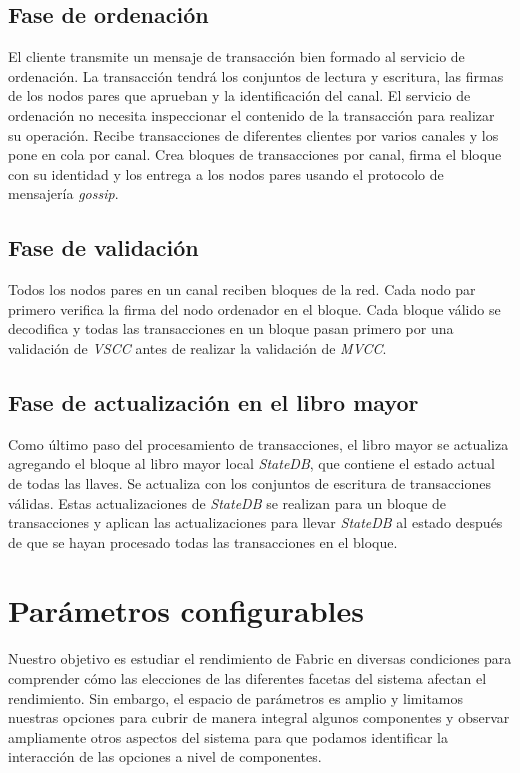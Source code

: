 \subsection{Fase de ordenaci\'on}
El cliente transmite un mensaje de transacci\'on bien formado al servicio de ordenaci\'on. La transacci\'on tendr\'a los conjuntos de lectura y escritura, las firmas de los nodos pares que aprueban y la identificaci\'on del canal. El servicio de ordenaci\'on no necesita inspeccionar el contenido de la transacci\'on para realizar su operaci\'on. Recibe transacciones de diferentes clientes por varios canales y los pone en cola por canal. Crea bloques de transacciones por canal, firma el bloque con su identidad y los entrega a los nodos pares usando el protocolo de mensajer\'ia \emph{gossip}.

\subsection{Fase de validaci\'on}
Todos los nodos pares en un canal reciben bloques de la red. Cada nodo par primero verifica la firma del nodo ordenador en el bloque. Cada bloque v\'alido se decodifica y todas las transacciones en un bloque pasan primero por una validaci\'on de \emph{VSCC} antes de realizar la validaci\'on de \emph{MVCC}.

\subsection{Fase de actualizaci\'on en el libro mayor}
Como \'ultimo paso del procesamiento de transacciones, el libro mayor se actualiza agregando el bloque al libro mayor local \emph{StateDB}, que contiene el estado actual de todas las llaves. Se actualiza con los conjuntos de escritura de transacciones v\'alidas. Estas actualizaciones de \emph{StateDB} se realizan para un bloque de transacciones y aplican las actualizaciones para llevar \emph{StateDB} al estado despu\'es de que se hayan procesado todas las transacciones en el bloque.

\section{Par\'ametros configurables}
Nuestro objetivo es estudiar el rendimiento de Fabric en diversas condiciones para comprender c\'omo las elecciones de las diferentes facetas del sistema afectan el rendimiento. Sin embargo, el espacio de par\'ametros es amplio y limitamos nuestras opciones para cubrir de manera integral algunos componentes y observar ampliamente otros aspectos del sistema para que podamos identificar la interacci\'on de las opciones a nivel de componentes.

